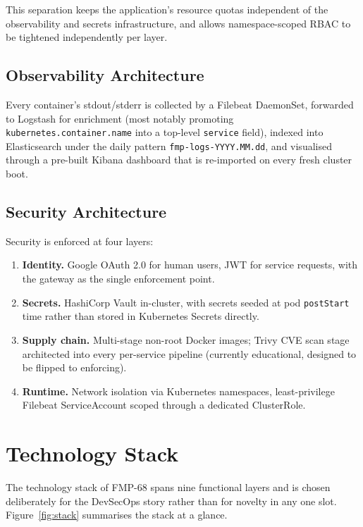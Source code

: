 \documentclass[11pt,a4paper]{article}
\begin{document}
This separation keeps the application's resource quotas independent
of the observability and secrets infrastructure, and allows
namespace-scoped RBAC to be tightened independently per layer.

\subsection{Observability Architecture}
Every container's stdout/stderr is collected by a Filebeat DaemonSet,
forwarded to Logstash for enrichment (most notably promoting
\texttt{kubernetes.container.name} into a top-level \texttt{service}
field), indexed into Elasticsearch under the daily pattern
\texttt{fmp-logs-YYYY.MM.dd}, and visualised through a pre-built Kibana
dashboard that is re-imported on every fresh cluster boot.

\subsection{Security Architecture}
Security is enforced at four layers:

\begin{enumerate}[leftmargin=*]
  \item \textbf{Identity.}  Google OAuth 2.0 for human users, JWT for
        service requests, with the gateway as the single enforcement
        point.
  \item \textbf{Secrets.}  HashiCorp Vault in-cluster, with secrets
        seeded at pod \texttt{postStart} time rather than stored in
        Kubernetes Secrets directly.
  \item \textbf{Supply chain.}  Multi-stage non-root Docker images;
        Trivy CVE scan stage architected into every per-service
        pipeline (currently educational, designed to be flipped to
        enforcing).
  \item \textbf{Runtime.}  Network isolation via Kubernetes namespaces,
        least-privilege Filebeat ServiceAccount scoped through a
        dedicated ClusterRole.
\end{enumerate}

\section{Technology Stack}

The technology stack of FMP-68 spans nine functional layers and is
chosen deliberately for the DevSecOps story rather than for novelty
in any one slot.  Figure~\ref{fig:stack} summarises the stack at a
glance.
\end{document}
